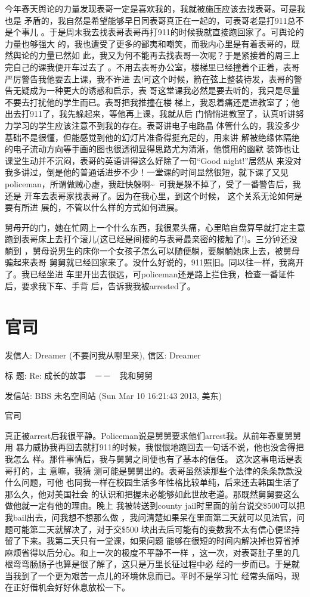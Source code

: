 \documentclass[12pt]{book}
\begin{document}
今年春天舆论的力量发现表哥一定是喜欢我的，我就被施压应该去找表哥。可是我也是
矛盾的，我自然是希望能够早日同表哥真正在一起的，可表哥老是打911总不是个事儿
。于是周末我去找表哥表哥再打911的时候我就直接跑回家了。可舆论的力量也够强大
的，我也遭受了更多的鄙夷和嘲笑，而我内心里是有着表哥的，既然舆论的力量已然如
此，我又为何不能再去找表哥一次呢？于是紧接着的周三上完自己的课我便开车过去了
。不用去表哥办公室，楼梯里已经撞着个正着，表哥严厉警告我他要去上课，我不许进
去!可这个时候，箭在弦上整装待发，表哥的警告无疑成为一种更大的诱惑和启示，表
哥这堂课我必然是要去听的，我只是尽量不要去打扰他的学生而已。表哥把我推撞在楼
梯上，我忍着痛还是进教室了；他出去打911了，我先躲起来，等他再上课，我就从后
门悄悄进教室了，认真听讲努力学习的学生应该注意不到我的存在。表哥讲电子电路晶
体管什么的，我没多少基础不是很懂，但能感觉到他的幻灯片准备得挺充足的，用来讲
解被绝缘体隔绝的电子流动方向等手画的图也很透彻显得思路尤为清淅，他惯用的幽默
装饰也让课堂生动并不沉闷，表哥的英语讲得这么好除了一句“Good night!”居然从
来没对我多讲过，倒是他的普通话进步不少！一堂课的时间显然很短，就下课了又见
policeman，所谓做贼心虚，我赶快躲啊\textasciitilde{}~可我是躲不掉了，受了一番警告后，我还是
开车去表哥家找表哥了。因为在我心里，到这个时候， 这个关系无论如何是要有所进
展的，不管以什么样的方式如何进展。

舅母开的门，她在忙网上一个什么东西，我很累头痛，心里暗自盘算早就打定主意
跑到表哥床上去打个滚儿(这已经是间接的与表哥最亲密的接触了!)。三分钟还没躺到
，舅母说男生的床你一个女孩子怎么可以随便躺，要躺躺她床上去，被舅母骗起来表哥
舅舅就已经回家来了。没什么好说的，911照旧。同以往一样，我离开了。我已经坐进
车里开出去很远，可policeman还是路上拦住我，检查一番证件后，要求我下车、手背
后，告诉我我被arrested了。
\section{官司}
\label{sec-12-6}
发信人: Dreamer (不要问我从哪里来), 信区: Dreamer

标  题: Re: 成长的故事　－－　我和舅舅

发信站: BBS 未名空间站 (Sun Mar 10 16:21:43 2013, 美东)

官司

真正被arrest后我很平静。Policeman说是舅舅要求他们arrest我。从前年春夏舅舅用
暴力威协我再回去就打911的时候，我恨恨地跑回去一句话不说，他也没舍得把我怎么
样。那件事情后，我与舅舅之间便也有了基本的信任。 这次这事电话是表哥打的，主
意嘛，我猜 测可能是舅舅出的。表哥虽然读那些个法律的条条款款没什么问题，可他
也同我一样在校园生活多年性格比较单纯，后来还去韩国生活了那么久，他对美国社会
的认识和把握未必能够如此世故老道。那既然舅舅要这么做他就一定有他的理由。晚上
我被转送到county jail时里面的前台说交\$500可以把我bail出去，问我想不想那么做
，我问清楚如果呆在里面第二天就可以见法官，问题可能第二天就解决了，对于交\$500
块出去后可能有的变数我不太有信心便坚持留了下来。我第二天只有一堂课，如果问题
能够在很短的时间内解决掉也算省掉麻烦省得以后分心。和上一次的极度不平静不一样
，这一次，对表哥肚子里的几根弯弯肠肠子也算是很了解了，这只是万里长征过程中必
经的一步而已。于是就当我到了一个更为艰苦一点儿的环境休息而已。平时不是学习忙
经常头痛吗，现在正好借机会好好休息放松一下。
\end{document}

